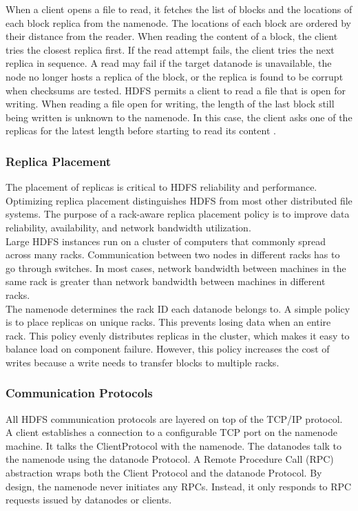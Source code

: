 When a client opens a file to read, it fetches the list of blocks and the locations of each block replica from the
namenode. The locations of each block are ordered by their distance from the reader. When reading the content of a block,
the client tries the closest replica first. If the read attempt fails, the client tries the next replica in sequence. A read may fail if the target datanode is unavailable, the node no longer hosts a replica of the block, or the replica is found to be corrupt when checksums are tested. HDFS permits a client to read a file that is open for writing. When reading a file open for writing, the length of the last
block still being written is unknown to the namenode. In this case, the client asks one of the replicas for the latest length before
starting to read its content \cite{cite23}.\\


\subsubsection{Replica Placement}
The placement of replicas is critical to HDFS reliability and performance. Optimizing replica placement distinguishes HDFS from most other distributed file systems. The purpose of a rack-aware replica placement policy is to improve data reliability, availability, and network bandwidth utilization.\\

Large HDFS instances run on a cluster of computers that commonly spread across many racks. Communication between two nodes in different racks has to go through switches. In most cases, network bandwidth between machines in the same rack is greater than network bandwidth between machines in different racks.\\

The namenode determines the rack ID each datanode belongs to. A simple policy is to place replicas on unique racks. This prevents losing data when an entire rack. This policy evenly distributes replicas in the cluster, which makes it easy to balance load on component failure. However, this policy increases the cost of writes because a write needs to transfer blocks to multiple racks.
\subsubsection{Communication Protocols}
All HDFS communication protocols are layered on top of the TCP/IP protocol. A client
establishes a connection to a configurable TCP port on the namenode machine. It talks
the ClientProtocol with the namenode. The datanodes talk to the namenode using the
datanode Protocol. A Remote Procedure Call (RPC) abstraction wraps both the Client
Protocol and the datanode Protocol. By design, the namenode never initiates any RPCs. Instead, it only responds to RPC requests issued by datanodes or clients.


